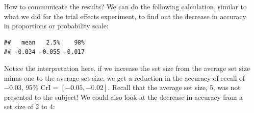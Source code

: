 \documentclass[12pt,ignorenonframetext,aspectratio=169]{beamer}
\newenvironment{Shaded}{\begin{snugshade}}{\end{snugshade}}
\newcommand{\DataTypeTok}[1]{\textcolor[rgb]{0.13,0.29,0.53}{#1}}
\newcommand{\DecValTok}[1]{\textcolor[rgb]{0.00,0.00,0.81}{#1}}
\newcommand{\FloatTok}[1]{\textcolor[rgb]{0.00,0.00,0.81}{#1}}
\newcommand{\KeywordTok}[1]{\textcolor[rgb]{0.13,0.29,0.53}{\textbf{#1}}}
\newcommand{\NormalTok}[1]{#1}
\newcommand{\OperatorTok}[1]{\textcolor[rgb]{0.81,0.36,0.00}{\textbf{#1}}}
\newcommand{\StringTok}[1]{\textcolor[rgb]{0.31,0.60,0.02}{#1}}
\begin{document}
\begin{frame}[fragile]{How to communicate the results?}
We can do the following calculation, similar to what we did for the trial effects experiment, to find out the decrease in accuracy in proportions or probability scale:

\small

\begin{Shaded}
\end{Shaded}

\begin{verbatim}
##   mean   2.5%    98% 
## -0.034 -0.055 -0.017
\end{verbatim}

\normalsize

Notice the interpretation here, if we increase the set size from the average set size minus one to the average set size, we get a reduction in the accuracy of recall of \(-0.03\), 95\% CrI = \([ -0.05 , -0.02 ]\). Recall that the average set size, 5, was not presented to the subject! We could also look at the decrease in accuracy from a set size of 2 to 4:

\small

\begin{Shaded}
\end{Shaded}


\end{frame}
\end{document}
